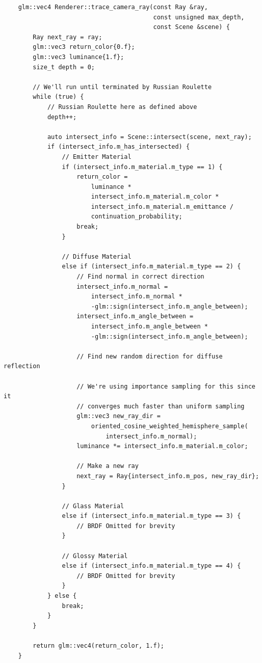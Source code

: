 \documentclass[
  twoside,
  11pt, a4paper,
  footinclude=true,
  headinclude=true,
  cleardoublepage=empty
]{scrreprt}
\begin{document}
\begin{verbatim}
    glm::vec4 Renderer::trace_camera_ray(const Ray &ray,
                                         const unsigned max_depth,
                                         const Scene &scene) {
        Ray next_ray = ray;
        glm::vec3 return_color{0.f};
        glm::vec3 luminance{1.f};
        size_t depth = 0;

        // We'll run until terminated by Russian Roulette
        while (true) {
            // Russian Roulette here as defined above
            depth++;

            auto intersect_info = Scene::intersect(scene, next_ray);
            if (intersect_info.m_has_intersected) {
                // Emitter Material
                if (intersect_info.m_material.m_type == 1) {
                    return_color =
                        luminance *
                        intersect_info.m_material.m_color *
                        intersect_info.m_material.m_emittance /
                        continuation_probability;
                    break;
                }

                // Diffuse Material
                else if (intersect_info.m_material.m_type == 2) {
                    // Find normal in correct direction
                    intersect_info.m_normal =
                        intersect_info.m_normal *
                        -glm::sign(intersect_info.m_angle_between);
                    intersect_info.m_angle_between =
                        intersect_info.m_angle_between *
                        -glm::sign(intersect_info.m_angle_between);

                    // Find new random direction for diffuse reflection

                    // We're using importance sampling for this since it
                    // converges much faster than uniform sampling
                    glm::vec3 new_ray_dir =
                        oriented_cosine_weighted_hemisphere_sample(
                            intersect_info.m_normal);
                    luminance *= intersect_info.m_material.m_color;

                    // Make a new ray
                    next_ray = Ray{intersect_info.m_pos, new_ray_dir};
                }

                // Glass Material
                else if (intersect_info.m_material.m_type == 3) {
                    // BRDF Omitted for brevity
                }

                // Glossy Material
                else if (intersect_info.m_material.m_type == 4) {
                    // BRDF Omitted for brevity
                }
            } else {
                break;
            }
        }

        return glm::vec4(return_color, 1.f);
    }
\end{verbatim} 
\begingroup
{}
\endgroup
\clearpage
\end{document}
